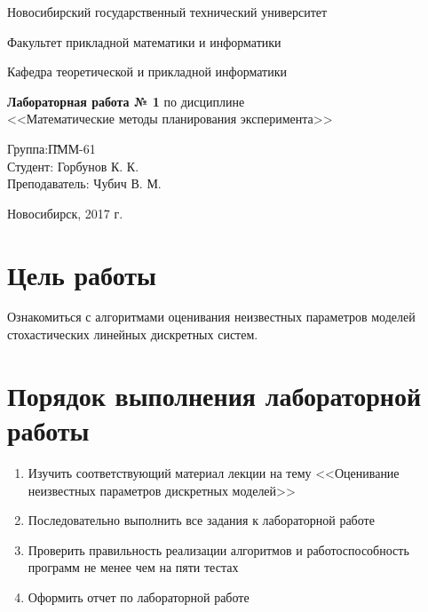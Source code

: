 \documentclass[a4paper,14pt]{extarticle}
\begin{document}
\setcounter{secnumdepth}{0}

\begin{titlepage}

  \begin{center}
    Новосибирский государственный технический университет
    
    Факультет прикладной математики и информатики
    
    Кафедра теоретической и прикладной информатики
    
    \vspace{250pt}
    
    \textbf{\LARGE{Лабораторная работа № 1}}
    \medbreak
    \small{по дисциплине \\
    \medbreak
    <<Математические методы планирования эксперимента>>}
    \vspace{100pt}
  \end{center}

  \begin{flushleft}
    \begin{tabbing}
      Группа:\qquad\qquad \= ПММ-61\\
      Студент:            \> Горбунов К. К.\\
      Преподаватель:      \> Чубич В. М.\\
    \end{tabbing}
  \end{flushleft}

  \begin{center}
    \vspace{\fill}
    Новосибирск, 2017 г.
  \end{center}

\end{titlepage}

\newpage

\section{Цель работы}

Ознакомиться с алгоритмами оценивания неизвестных параметров моделей
стохастических линейных дискретных систем.

\section{Порядок выполнения лабораторной работы}

\begin{enumerate}
\item Изучить соответствующий материал лекции на тему <<Оценивание
  неизвестных параметров дискретных моделей>>

\item Последовательно выполнить все задания к лабораторной работе

\item Проверить правильность реализации алгоритмов и работоспособность
  программ не менее чем на пяти тестах

\item Оформить отчет по лабораторной работе
\end{enumerate}
\end{document}
